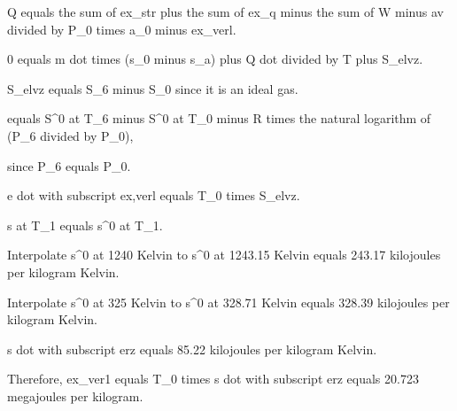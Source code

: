 Q equals the sum of ex_str plus the sum of ex_q minus the sum of W minus av divided by P_0 times a_0 minus ex_verl.

0 equals m dot times (s_0 minus s_a) plus Q dot divided by T plus S_elvz.

S_elvz equals S_6 minus S_0 since it is an ideal gas.

equals S^0 at T_6 minus S^0 at T_0 minus R times the natural logarithm of (P_6 divided by P_0),

since P_6 equals P_0.

e dot with subscript ex,verl equals T_0 times S_elvz.

s at T_1 equals s^0 at T_1.

Interpolate s^0 at 1240 Kelvin to s^0 at 1243.15 Kelvin equals 243.17 kilojoules per kilogram Kelvin.

Interpolate s^0 at 325 Kelvin to s^0 at 328.71 Kelvin equals 328.39 kilojoules per kilogram Kelvin.

s dot with subscript erz equals 85.22 kilojoules per kilogram Kelvin.

Therefore, ex_ver1 equals T_0 times s dot with subscript erz equals 20.723 megajoules per kilogram.